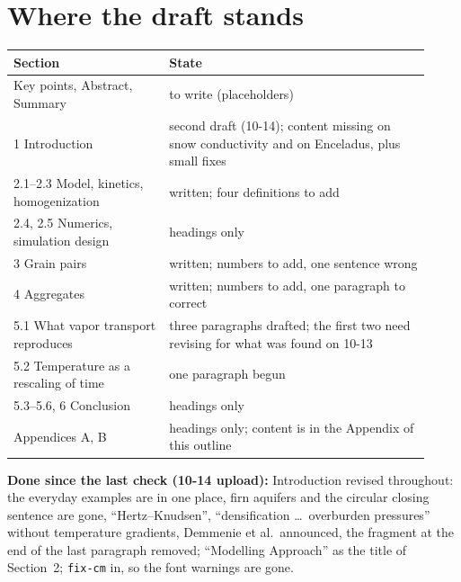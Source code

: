\documentclass[11pt]{article}
\begin{document}
\section*{Where the draft stands}

\begin{center}\begin{tabular}{p{0.34\linewidth}p{0.58\linewidth}}\toprule
Section & State\\\midrule
Key points, Abstract, Summary & to write (placeholders)\\
1 Introduction & second draft (10-14); content missing on snow conductivity and on Enceladus, plus small fixes\\
2.1--2.3 Model, kinetics, homogenization & written; four definitions to add\\
2.4, 2.5 Numerics, simulation design & headings only\\
3 Grain pairs & written; numbers to add, one sentence wrong\\
4 Aggregates & written; numbers to add, one paragraph to correct\\
5.1 What vapor transport reproduces & three paragraphs drafted; the first two need revising for what was found on 10-13\\
5.2 Temperature as a rescaling of time & one paragraph begun\\
5.3--5.6, 6 Conclusion & headings only\\
Appendices A, B & headings only; content is in the Appendix of this outline\\\bottomrule
\end{tabular}\end{center}

\textbf{Done since the last check (10-14 upload):} Introduction revised
throughout: the everyday examples are in one place, firn aquifers and the
circular closing sentence are gone, ``Hertz--Knudsen'', ``densification
\ldots\ overburden pressures'' without temperature gradients, Demmenie et
al.\ announced, the fragment at the end of the last paragraph removed;
``Modelling Approach'' as the title of Section~2; \verb|fix-cm| in, so the
font warnings are gone.
\end{document}
